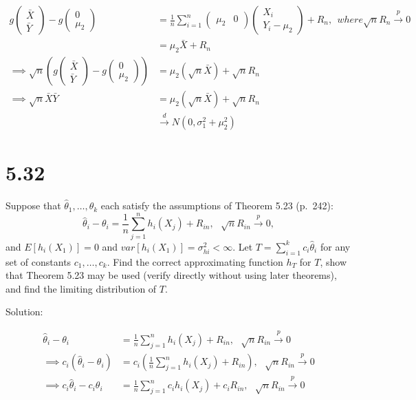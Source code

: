\documentclass[
  letterpaper,
  DIV=11,
  numbers=noendperiod]{scrreprt}
\begin{document}
\[\begin{aligned}
g\begin{pmatrix} \bar X \\ {\bar Y} \end{pmatrix} - g\begin{pmatrix} {0} \\ \mu_2 \end{pmatrix} 
&= \frac 1 n \sum_{i=1}^n \begin{pmatrix} \mu_2 & 0 \end{pmatrix} \begin{pmatrix} X_i \\ Y_i - \mu_2 \end{pmatrix} + R_n,  ~~ where \sqrt n R_n \overset p \to 0 \\
&= \mu_2 \bar X + R_n \\
\implies  \sqrt n \left( g\begin{pmatrix} \bar X \\ {\bar Y} \end{pmatrix} - g\begin{pmatrix} {0} \\ \mu_2 \end{pmatrix} \right) &=  \mu_2(\sqrt n \bar X) +\sqrt n R_n \\
\implies  \sqrt n  \bar X {\bar Y}  &=  \mu_2(\sqrt n \bar X) +\sqrt n R_n \\
& \overset d \to N(0, \sigma_1^2 + \mu_2^2)
\end{aligned}\]

\hypertarget{section-34}{%
\section{5.32}\label{section-34}}

Suppose that \(\hat \theta_1, \dots, \hat \theta_k\) each satisfy the
assumptions of Theorem 5.23 (p.~242):
\[\hat \theta_i - \theta_i = \frac 1 n \sum_{j=1}^n h_i(X_j) + R_{in},~~~\sqrt n R_{in} \overset p \to 0,\]
and \(E[h_i(X_1)] = 0\) and \(var[h_i(X_1)] = \sigma_{hi}^2 < \infty\).
Let \(T = \sum_{i=1}^k c_i \hat \theta_i\) for any set of constants
\(c_1, \dots, c_k\). Find the correct approximating function \(h_T\) for
\(T\), show that Theorem 5.23 may be used (verify directly without using
later theorems), and find the limiting distribution of \(T\).

Solution:

\[\begin{aligned}
\hat \theta_i - \theta_i &= \frac 1 n \sum_{j=1}^n h_i(X_j) + R_{in},~~~\sqrt n R_{in} \overset p \to 0 \\
\implies c_i(\hat \theta_i - \theta_i) &= c_i\left(\frac 1 n \sum_{j=1}^n h_i(X_j) + R_{in} \right),~~~\sqrt n R_{in} \overset p \to 0 \\
\implies c_i \hat \theta_i - c_i\theta_i &= \frac 1 n \sum_{j=1}^n c_ih_i(X_j) + c_iR_{in},~~~\sqrt n R_{in} \overset p \to 0 \\
\end{aligned}\]
\end{document}
